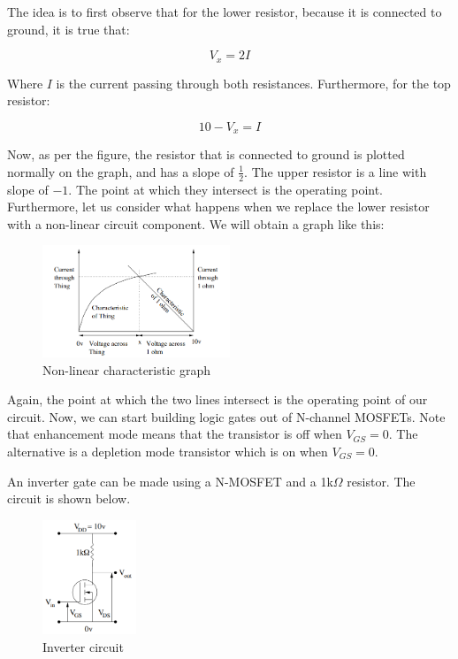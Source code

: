 \documentclass{article}
\begin{document}
The idea is to first observe that for the lower resistor, because it is connected to ground, it is true that:

\[ V_x = 2I \]

Where $I$ is the current passing through both resistances. Furthermore, for the top resistor:

\[ 10 - V_x = I\]

Now, as per the figure, the resistor that is connected to ground is plotted normally on the graph, and has a slope of $\frac{1}{2}$. The upper resistor is a line with slope of $-1$. The point at which they intersect is the operating point. Furthermore, let us consider what happens when we replace the lower resistor with a non-linear circuit component. We will obtain a graph like this:

\begin{figure}[h]
    \centering
    \includegraphics[width = 0.5\textwidth]{images/Screenshot 2024-04-06 111810.png}
    \caption{Non-linear characteristic graph}
    \label{fig:enter-label}
\end{figure}

Again, the point at which the two lines intersect is the operating point of our circuit. Now, we can start building logic gates out of N-channel MOSFETs. Note that enhancement mode means that the transistor is off when $V_{GS} = 0$. The alternative is a depletion mode transistor which is on when $V_{GS} = 0$.

\begin{proposition}
    An inverter gate can be made using a N-MOSFET and a 1k$\Omega$ resistor. The circuit is shown below.
\end{proposition}

\begin{figure}[h]
    \centering
    \includegraphics[width = 0.25\textwidth]{images/Screenshot 2024-04-06 112244.png}
    \caption{Inverter circuit}
    \label{fig:enter-label}
\end{figure}
\end{document}
